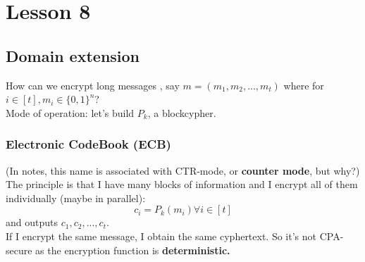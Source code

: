 \chapter*{Lesson 8}
\section{Domain extension}

How can we encrypt long messages , say $m=(m_{1}, m_{2}, ..., m_{t})$ where
for $i \in [t], m_{i} \in \{0,1\}^{n} $?\\

Mode of operation: let's build $P_{k}$, a blockcypher.\\

\subsection{Electronic CodeBook (ECB)}

(In notes, this name is associated with CTR-mode, or \textbf{counter mode}, but
why?)\\
The principle is that I have many blocks of information and I encrypt all of
them individually (maybe in parallel):
\[
    c_{i}=P_{k}(m_{i}) \forall i \in [t]
\]
and outputs $c_{1}, c_{2}, ..., c_{t}$.\\

If I encrypt the same message, I obtain the same cyphertext. So it's not
CPA-secure as the encryption function is \textbf{deterministic.} \\

